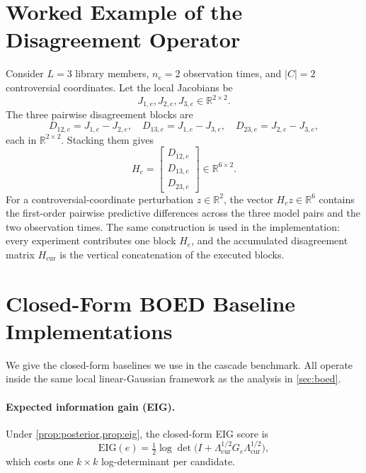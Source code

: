 \documentclass{article}
\newcommand{\real}{\mathbb{R}}
\theoremstyle{plain}
\theoremstyle{definition}
\theoremstyle{remark}
\begin{document}
\section{Worked Example of the Disagreement Operator}
\label{app:he-example}

Consider $L=3$ library members, $n_e=2$ observation times, and
$|C|=2$ controversial coordinates. Let the local Jacobians be
\[
J_{1,e},J_{2,e},J_{3,e}\in\real^{2\times 2}.
\]
The three pairwise disagreement blocks are
\[
D_{12,e}=J_{1,e}-J_{2,e},\quad
D_{13,e}=J_{1,e}-J_{3,e},\quad
D_{23,e}=J_{2,e}-J_{3,e},
\]
each in $\real^{2\times 2}$. Stacking them gives
\[
H_e=\begin{bmatrix}
D_{12,e}\\
D_{13,e}\\
D_{23,e}
\end{bmatrix}\in\real^{6\times 2}.
\]
For a controversial-coordinate perturbation $z\in\real^2$, the vector
$H_e z\in\real^6$ contains the first-order pairwise predictive differences
across the three model pairs and the two observation times. The same
construction is used in the implementation: every experiment contributes one
block $H_e$, and the accumulated disagreement matrix
$H_{\mathrm{cur}}$ is the vertical concatenation of the executed blocks.

\section{Closed-Form BOED Baseline Implementations}
\label{app:baselines}

We give the closed-form baselines we use in the cascade benchmark. All
operate inside the same local linear-Gaussian framework as the analysis in
\cref{sec:boed}.

\paragraph{Expected information gain (EIG).}
Under \cref{prop:posterior,prop:eig}, the closed-form EIG score is
\begin{equation}
\mathrm{EIG}(e) = \tfrac{1}{2}\log\det\!\big(I+\Lambda_{\mathrm{cur}}^{1/2}G_e\Lambda_{\mathrm{cur}}^{1/2}\big),
\end{equation}
which costs one $k\times k$ log-determinant per candidate.
\end{document}
